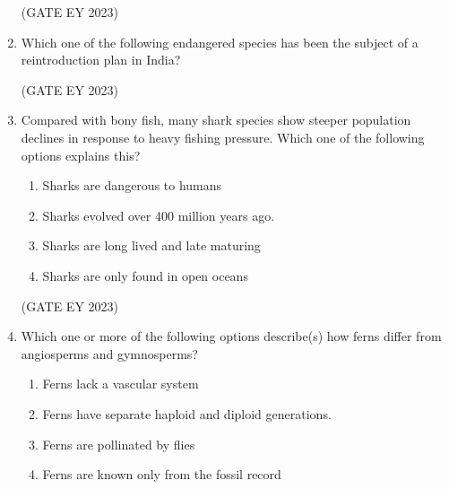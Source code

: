 \documentclass[journal,12pt,onecolumn]{IEEEtran}
\theoremstyle{remark}
\begin{document}
\begin{enumerate}
\begin{enumerate}
\end{enumerate}

\hfill{(GATE EY 2023)}




 \item Which one of the following endangered species has been the subject of a
reintroduction plan in India?
\begin{enumerate}
\end{enumerate}



\hfill{(GATE EY 2023)}



 \item Compared with bony fish, many shark species show steeper population declines in
response to heavy fishing pressure. Which one of the following options explains
this?

\begin{enumerate}

\item Sharks are dangerous to humans
\item Sharks evolved over 400 million years ago.
\item Sharks are long lived and late maturing
\item Sharks are only found in open oceans


\end{enumerate}



\hfill{(GATE EY 2023)}


 \item Which one or more of the following options describe(s) how ferns differ from
angiosperms and gymnosperms?
\begin{enumerate}

\item Ferns lack a vascular system
\item Ferns have separate haploid and diploid generations.
\item Ferns are pollinated by flies
\item Ferns are known only from the fossil record



\end{enumerate}
\end{enumerate}
\end{document}
